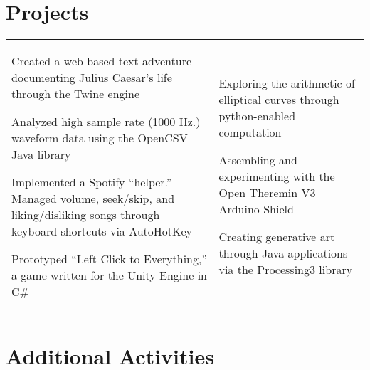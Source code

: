 \documentclass[10.5pt, letterpaper]{article}
\begin{document}

\vspace{-32pt}
\section*{Projects}
\vspace{-8pt}

\begin{center}
	\begin{tabularx}{\textwidth}[t]{X X}
		
		\begin{description}
			\item [Prior Projects] 
				Created a web-based text adventure documenting Julius Caesar's life through the Twine engine
			\item Analyzed high sample rate (1000 Hz.) waveform data using the OpenCSV Java library
			\item Implemented a Spotify ``helper.'' Managed volume, seek/skip, and liking/disliking songs through keyboard shortcuts via AutoHotKey
			\item Prototyped ``Left Click to Everything,'' a game written for the Unity Engine in C\#
		\end{description}
		&
		
		\begin{description}
			\item [Current Projects] 
				Exploring the arithmetic of elliptical curves through python-enabled computation
			\item Assembling and experimenting with the Open Theremin V3 Arduino Shield
			\item Creating generative art through Java applications via the Processing3 library
		\end{description}
	\end{tabularx}
\end{center}

\section*{Additional Activities}
\vspace{-18pt}
\end{document}
